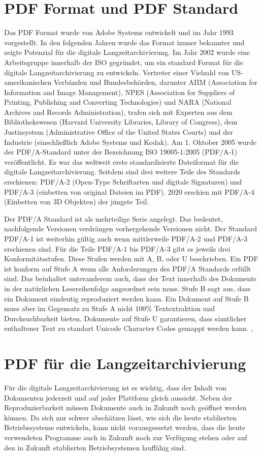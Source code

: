 \documentclass[a4paper,oneside, 12pt]{report}
\begin{document}
\section{PDF Format und PDF Standard}
Das PDF Format wurde von Adobe Systems entwickelt und im Jahr 1993 vorgestellt. In den folgenden Jahren wurde das Format immer bekannter und zeigte Potenzial für die digitale Langzeitarchivierung. Im Jahr 2002 wurde eine Arbeitsgruppe innerhalb der \ac{ISO} gegründet, um ein standard Format für die digitale Langzeitarchivierung zu entwickeln. Vertreter einer Vielzahl von US-amerikanischen Verbänden und Bundesbehörden, darunter AIIM (Association for Information and Image Management), NPES (Association for Suppliers of Printing, Publishing and Converting Technologies) und NARA (National Archives and Records Administration), trafen sich mit Experten aus dem Bibliothekswesen (Harvard University Libraries, Library of Congress), dem Justizsystem (Administrative Office of the United States Courts) und der Industrie (einschließlich Adobe Systems und Kodak). Am 1. Oktober 2005 wurde der PDF/A-Standard unter der Bezeichnung ISO 19005-1:2005 (PDF/A-1) veröffentlicht. Es war das weltweit erste standardisierte Dateiformat für die digitale Langzeitarchivierung. Seitdem sind drei weitere Teile des Standards erschienen: PDF/A-2 (Open-Type Schriftarten und digitale Signaturen) und PDF/A-3 (einbetten von original Dateien im PDF). 2020 erschien mit PDF/A-4 (Einbetten von 3D Objekten) der jüngste Teil. \cite{pdfhist}

Der PDF/A Standard ist als mehrteilige Serie angelegt. Das bedeutet, nachfolgende Versionen verdrängen vorhergehende Versionen nicht. Der Standard PDF/A-1 ist weiterhin gültig auch wenn mittlerweile PDF/A-2 und PDF/A-3 erschienen sind. Für die Teile PDF/A-1 bis PDF/A-3 gibt es jeweils drei Konformitätsstufen. Diese Stufen werden mit A, B, oder U beschrieben. Ein PDF ist konform auf Stufe A wenn alle Anforderungen des PDF/A Standards erfüllt sind. Das beinhaltet unteranderem auch, dass der Text innerhalb des Dokuments in der natürlichen Lesereihenfolge angeordnet sein muss. Stufe B sagt aus, dass ein Dokument eindeutig reproduziert werden kann. Ein Dokument auf Stufe B muss aber im Gegensatz zu Stufe A nicht 100\% Textextraktion und Durchsuchbarkeit bieten. Dokumente auf Stufe U garantieren, dass sämtlicher enthaltener Text zu standart Unicode Character Codes gemappt werden kann. \cite{pdfhist}, \cite{pdftools}


\section{PDF für die Langzeitarchivierung}
Für die digitale Langzeitarchivierung ist es wichtig, dass der Inhalt von Dokumenten jederzeit und auf jeder Plattform gleich aussieht. Neben der Reproduzierbarkeit müssen Dokumente auch in Zukunft noch geöffnet werden können. Da sich nur schwer abschätzen lässt, wie sich die heute etablierten Betriebssysteme entwickeln, kann nicht vorausgessetzt werden, dass die heute verwendeten Programme auch in Zukunft noch zur Verfügung stehen oder auf den in Zukunft etablierten Betriebsystemen lauffähig sind.
\end{document}
